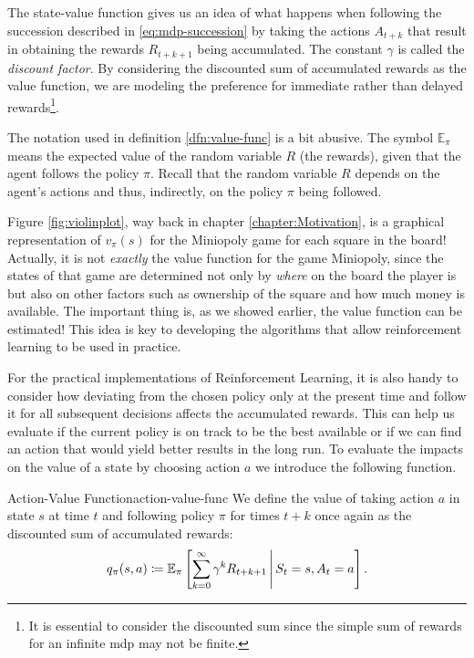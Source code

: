 The state-value function gives us an idea of what happens when following the
succession described in \eqref{eq:mdp-succession} by taking the actions
$A_{t+k}$ that result in obtaining the rewards $R_{t+k+1}$ being accumulated.
The constant $\gamma$ is called the \textit{discount factor}. By
considering the discounted sum of accumulated rewards as the value function, we
are modeling the preference for immediate rather than delayed
rewards\footnote{It is essential to consider the discounted sum since the simple
sum of rewards for an infinite \ac{mdp} may not be finite.}. 

The notation used in definition \ref{dfn:value-func} is a bit abusive. The
symbol $\mathbb{E}_{\pi}$ means the expected value of the random variable $R$
(the rewards), given that the agent follows the policy $\pi$. Recall that the
random variable $R$ depends on the agent's actions and thus, indirectly, on the
policy $\pi$ being followed.

Figure \ref{fig:violinplot}, way back in chapter \ref{chapter:Motivation}, is
a graphical representation of $v_\pi (s)$ for the Miniopoly game for each square
in the board! Actually, it is not \textit{exactly} the value function for the
game Miniopoly, since the states of that game are determined not only by
\textit{where} on the board the player is but also on other factors such as
ownership of the square and how much money is available. The important thing is,
as we showed earlier, the value function can be estimated! This idea is key to
developing the algorithms that allow reinforcement learning to be used in
practice.

For the practical implementations of Reinforcement Learning, it is also handy to
consider how deviating from the chosen policy only at the present time and
follow it for all subsequent decisions affects the accumulated rewards. This can
help us evaluate if the current policy is on track to be the best available or
if we can find an action that would yield better results in the long run. To
evaluate the impacts on the value of a state by choosing action $a$ we introduce
the following function. 

\begin{dfn}{Action-Value Function}{action-value-func}
	We define the value of taking action $a$ in state $s$ at time $t$ and
	following policy $\pi$ for times $t+k$ once again as the discounted sum of
	accumulated rewards:
	\[
		q_\pi (s, a) \coloneqq \mathbb{E}_{\pi} \left[ \sum_{k=0}^{\infty} \gamma^{k} R_{t+k+1} \,\middle\vert\, S_t = s, A_t = a \right].
	\]
\end{dfn}

